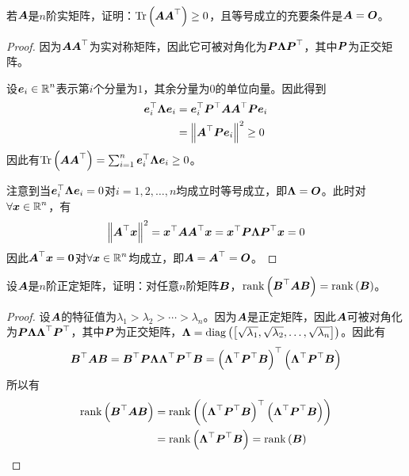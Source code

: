 \begin{problem}
若\(\mata\)是\(n\)阶实矩阵，证明：\(\trace{\mata\mata^\top}\ge0\)，且等号成立的充要条件是\(\mata=\mato\)。
\end{problem}
\begin{proof}
    因为\(\mata\mata^\top\)为实对称矩阵，因此它可被对角化为\(\matp\matlam\matp^\top\)，其中\(\matp\)为正交矩阵。

    设\(\vece_i\in\rea^n\)表示第\(i\)个分量为\(1\)，其余分量为\(0\)的单位向量。因此得到
    \begin{align*}
        \vece_i^\top\matlam\vece_i & =\vece_i^\top\matp^\top\mata\mata^\top\matp\vece_i \\
                                   & =\Abs{\mata^\top\matp\vece_i}^2\ge0
    \end{align*}
    因此有\(\trace{\mata\mata^\top}=\sum_{i=1}^n\vece_i^\top\matlam\vece_i\ge0\)。

    注意到当\(\vece_i^\top\matlam\vece_i=0\)对\(i=1,2,\dots,n\)均成立时等号成立，即\(\matlam=\mato\)。此时对\(\forall\vecx\in\rea^n\)，有
    \begin{equation*}
        \Abs{\mata^\top\vecx}^2=\vecx^\top\mata\mata^\top\vecx=\vecx^\top\matp\matlam\matp^\top\vecx=0
    \end{equation*}
    因此\(\mata^\top\vecx=\veczero\)对\(\forall\vecx\in\rea^n\)均成立，即\(\mata=\mata^\top=\mato\)。
\end{proof}

\begin{problem}
设\(\mata\)是\(n\)阶正定矩阵，证明：对任意\(n\)阶矩阵\(\matb\)，\(\rank{\matb^\top\mata\matb}=\rank{\matb}\)。
\end{problem}
\begin{proof}
    设\(\mata\)的特征值为\(\lambda_1>\lambda_2>\cdots>\lambda_n\)。因为\(\mata\)是正定矩阵，因此\(\mata\)可被对角化为\(\matp\matlam\matlam^\top\matp^\top\)，其中\(\matp\)为正交矩阵，\(\matlam=\diag{\mat{\sqrt{\lambda_1},\sqrt{\lambda_2},\dots,\sqrt{\lambda_n}}}\)。因此有
    \begin{equation*}
        \matb^\top\mata\matb=\matb^\top\matp\matlam\matlam^\top\matp^\top\matb=\spar{\matlam^\top\matp^\top\matb}^\top\spar{\matlam^\top\matp^\top\matb}
    \end{equation*}
    所以有
    \begin{align*}
        \rank{\matb^\top\mata\matb} & =\rank{\spar{\matlam^\top\matp^\top\matb}^\top\spar{\matlam^\top\matp^\top\matb}} \\
                                    & =\rank{\matlam^\top\matp^\top\matb}=\rank{\matb}
    \end{align*}
\end{proof}